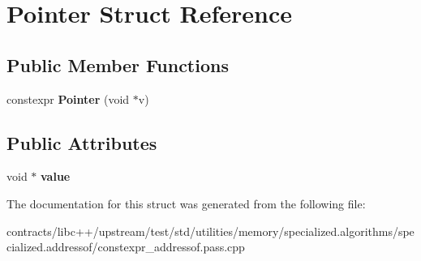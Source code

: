 \hypertarget{struct_pointer}{}\section{Pointer Struct Reference}
\label{struct_pointer}
\subsection*{Public Member Functions}
\begin{DoxyCompactItemize}
\item 
\mbox{\label{struct_pointer_a856fab87e86edf8f53c1b732a1a3716f}} 
constexpr {\bfseries Pointer} (void $\ast$v)
\end{DoxyCompactItemize}
\subsection*{Public Attributes}
\begin{DoxyCompactItemize}
\item 
\mbox{\label{struct_pointer_a6102eb1a32b8c77c7d1d4562937a0f0c}} 
void $\ast$ {\bfseries value}
\end{DoxyCompactItemize}


The documentation for this struct was generated from the following file\+:\begin{DoxyCompactItemize}
\item 
contracts/libc++/upstream/test/std/utilities/memory/specialized.\+algorithms/specialized.\+addressof/constexpr\+\_\+addressof.\+pass.\+cpp\end{DoxyCompactItemize}
